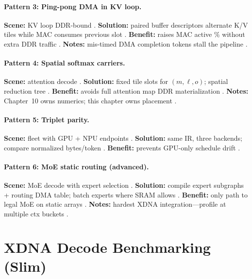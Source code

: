 \paragraph{Pattern 3: Ping-pong DMA in KV loop.}
\textbf{Scene:} KV loop DDR-bound \citep{semianalysis2024tma,dao2023flashdecoding}.
\textbf{Solution:} paired buffer descriptors alternate K/V tiles while MAC consumes previous slot \citep{amd2024xdna,nvidia2022hopper}.
\textbf{Benefit:} raises MAC active \% without extra DDR traffic \citep{patel2025llminference}.
\textbf{Notes:} mis-timed DMA completion tokens stall the pipeline \citep{yirage2026}.

\paragraph{Pattern 4: Spatial softmax carriers.}
\textbf{Scene:} attention decode \citep{dao2022flashattention}.
\textbf{Solution:} fixed tile slots for $(m,\ell,o)$; spatial reduction tree \citep{amd2024aie,dao2023flashdecoding}.
\textbf{Benefit:} avoids full attention map DDR materialization \citep{memoryfloor2026}.
\textbf{Notes:} Chapter~10 owns numerics; this chapter owns placement \citep{yirage2026}.

\paragraph{Pattern 5: Triplet parity.}
\textbf{Scene:} fleet with GPU + NPU endpoints \citep{patel2025llminference,amd2024xdna}.
\textbf{Solution:} same IR, three backends; compare normalized bytes/token \citep{yirage2026,chen2020compilerbasedhardw}.
\textbf{Benefit:} prevents GPU-only schedule drift \citep{taxbreak2026,memoryfloor2026}.

\paragraph{Pattern 6: MoE static routing (advanced).}
\textbf{Scene:} MoE decode with expert selection \citep{liu2024deepseekv3,taxbreak2026}.
\textbf{Solution:} compile expert subgraphs + routing DMA table; batch experts where SRAM allows \citep{amd2024aie,yirage2026}.
\textbf{Benefit:} only path to legal MoE on static arrays \citep{patel2025llminference}.
\textbf{Notes:} hardest XDNA integration---profile at multiple ctx buckets \citep{kwon2023vllm}.

\section{XDNA Decode Benchmarking (Slim)}
\label{sec:ch05_ryzen_benchmark}

